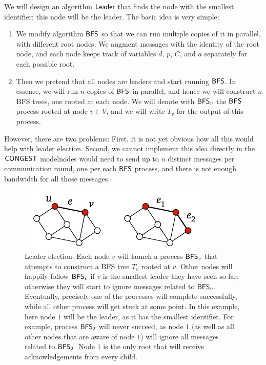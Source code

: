 We will design an algorithm $\textup{\sffamily Leader}$ that finds the node with the smallest identifier; this node will be the leader. The basic idea is very simple:
\begin{enumerate}
    \item We modify algorithm $\textup{\sffamily BFS}$ so that we can run multiple copies of it in parallel, with different root nodes. We augment messages with the identity of the root node, and each node keeps track of variables $d$, $p$, $C$, and $a$ separately for each possible root.
    \item Then we pretend that all nodes are leaders and start running $\textup{\sffamily BFS}$. In essence, we will run $n$ copies of $\textup{\sffamily BFS}$ in parallel, and hence we will construct $n$ BFS trees, one rooted at each node. We will denote with $\textup{\sffamily BFS}_v$ the $\textup{\sffamily BFS}$ process rooted at node $v \in V$, and we will write $T_v$ for the output of this process.
\end{enumerate}
However, there are two problems: First, it is not yet obvious how all this would help with leader election. Second, we cannot implement this idea directly in the $\textup{\sffamily CONGEST}$ model\mydash nodes would need to send up to $n$ distinct messages per communication round, one per each $\textup{\sffamily BFS}$ process, and there is not enough bandwidth for all those messages.

\begin{figure}
    \centering
    \includegraphics[page=\PLeader]{figs.pdf}
    \caption{Leader election. Each node $v$ will launch a process $\textup{\sffamily BFS}_v$ that attempts to construct a BFS tree $T_v$ rooted at $v$. Other nodes will happily follow $\textup{\sffamily BFS}_v$ if $v$ is the smallest leader they have seen so far; otherwise they will start to ignore messages related to $\textup{\sffamily BFS}_v$. Eventually, precisely one of the processes will complete successfully, while all other process will get stuck at some point. In this example, here node $1$ will be the leader, as it has the smallest identifier. For example, process $\textup{\sffamily BFS}_2$ will never succeed, as node $1$ (as well as all other nodes that are aware of node $1$) will ignore all messages related to $\textup{\sffamily BFS}_2$. Node $1$ is the only root that will receive acknowledgements from every child.}\label{fig:leader}
\end{figure}

